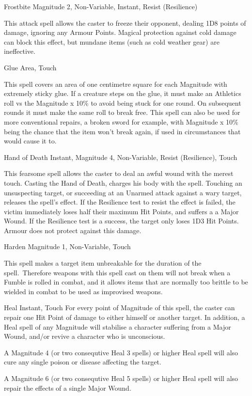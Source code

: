 \begin{rpg-spell}
{Frostbite}
{Magnitude 2, Non-Variable, Instant, Resist (Resilience)}

This attack spell allows the caster to freeze their opponent, dealing 1D8 points of damage, ignoring any Armour Points. Magical protection against cold damage can block this effect, but mundane items (such as cold weather gear) are ineffective.
\end{rpg-spell}


\begin{rpg-spell}
{Glue}
{Area, Touch}

This spell covers an area of one centimetre square for each Magnitude with extremely sticky glue. If a creature steps on the glue, it must make an Athletics roll vs the Magnitude x 10\% to avoid being stuck for one round. On subsequent rounds it must make the same roll to break free. This spell can also be used for more conventional repairs, a broken sword for example, with Magnitude x 10\% being the chance that the item won’t break again, if used in circumstances that would cause it to.
\end{rpg-spell}


\begin{rpg-spell}
{Hand of Death}
{Instant, Magnitude 4, Non-Variable, Resist (Resilience), Touch}

This fearsome spell allows the caster to deal an awful wound with the merest touch. Casting the Hand of Death, charges his body with the spell. Touching an unsuspecting target, or succeeding at an Unarmed attack against a wary target, releases the spell’s effect. If the Resilience test to resist the effect is failed, the victim immediately loses half their maximum Hit Points, and suffers a a Major Wound. If the Resilience test is a success, the target only loses 1D3 Hit Points. Armour does not protect against this damage.
\end{rpg-spell}


\begin{rpg-spell}
{Harden}
{Magnitude 1, Non-Variable, Touch}

This spell makes a target item unbreakable for the duration of the spell. Therefore weapons with this spell cast on them will not break when a Fumble is rolled in combat, and it allows items that are normally too brittle to be wielded in combat to be used as improvised weapons.
\end{rpg-spell}


\begin{rpg-spell}
{Heal}
{Instant, Touch}
For every point of Magnitude of this spell, the caster can repair one Hit Point of damage to either himself or another target. In addition, a Heal spell of any Magnitude will stabilise a character suffering from a Major Wound, and/or revive a character who is unconscious. 

A Magnitude 4 (or two consequtive Heal 3 spells) or higher Heal spell will also cure any single poison or disease affecting the target. 

A Magnitude 6 (or two consequtive Heal 5 spells) or higher Heal spell will also repair the effects of a single Major Wound.
\end{rpg-spell}


